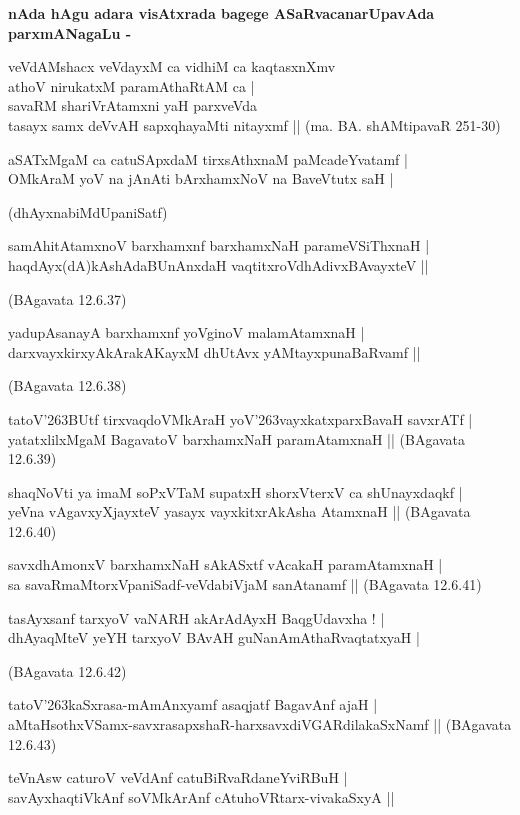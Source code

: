 {\bigskip
\noindent
{\large\bf nAda hAgu adara visAtxrada bagege ASaRvacanarUpavAda parxmANagaLu -}}
\begin{itemize}
{\bf
\item[1.] veVdAMshacx veVdayxM ca vidhiM ca kaqtasxnXmv\\\label{144}
athoV nirukatxM paramAthaRtAM ca |\\
savaRM shariVrAtamxni yaH parxveVda\\
tasayx samx deVvAH sapxqhayaMti nitayxmf ||
\hfill{(ma. BA. shAMtipavaR 251-30)}
\item[2.] aSATxMgaM ca catuSApxdaM tirxsAthxnaM paMcadeYvatamf |\\\label{144}
OMkAraM yoV na jAnAti bArxhamxNoV na BaveVtutx saH |

\hfill{(dhAyxnabiMdUpaniSatf)}
\item[3.] samAhitAtamxnoV barxhamxnf barxhamxNaH parameVSiThxnaH |\\\label{144}
haqdAyx(dA)kAshAdaBUnAnxdaH vaqtitxroVdhAdivxBAvayxteV ||

\hfill{(BAgavata 12.6.37)}}

{\bf
\item[4.] yadupAsanayA barxhamxnf yoVginoV malamAtamxnaH |\\
darxvayxkirxyAkArakAKayxM dhUtAvx yAMtayxpunaBaRvamf ||

\hfill{(BAgavata 12.6.38)}
\item[5.] tatoV\char'263BUtf tirxvaqdoVMkAraH yoV\char'263vayxkatxparxBavaH savxrATf |\\
yatatxlilxMgaM BagavatoV barxhamxNaH paramAtamxnaH ||
\hfill{(BAgavata 12.6.39)}
\item[6.] shaqNoVti ya imaM soPxVTaM supatxH shorxVterxV ca shUnayxdaqkf |\\
yeVna vAgavxyXjayxteV yasayx vayxkitxrAkAsha AtamxnaH ||
\hfill{(BAgavata 12.6.40)}
\item[7.] savxdhAmonxV barxhamxNaH sAkASxtf vAcakaH paramAtamxnaH |\\
sa savaRmaMtorxVpaniSadf-veVdabiVjaM sanAtanamf ||
\hfill{(BAgavata 12.6.41)}
\item[8.] tasAyxsanf tarxyoV vaNARH akArAdAyxH BaqgUdavxha ! |\\
dhAyaqMteV yeYH tarxyoV BAvAH guNanAmAthaRvaqtatxyaH |

\hfill{(BAgavata 12.6.42)}
\item[9.] tatoV\char'263kaSxrasa-mAmAnxyamf asaqjatf BagavAnf ajaH |\\
aMtaHsothxVSamx-savxrasapxshaR-harxsavxdiVGARdilakaSxNamf ||
\hfill{(BAgavata 12.6.43)}
\item[10.] teVnAsw caturoV veVdAnf catuBiRvaRdaneYviRBuH |\\
savAyxhaqtiVkAnf soVMkArAnf cAtuhoVRtarx-vivakaSxyA ||

}
\end{itemize}
